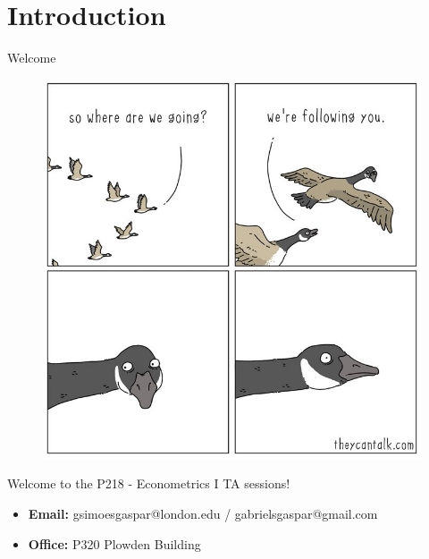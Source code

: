 \section{Introduction}

\begin{frame}{Welcome}

    \begin{figure}[ht]
        \centering
        \includegraphics[width=0.5\linewidth]{./resources/meme-birds.jpeg}
    \end{figure}
    
    Welcome to the P218 - Econometrics I TA sessions!
    \begin{itemize}
        \item \textbf{Email:} gsimoesgaspar@london.edu / gabrielsgaspar@gmail.com
        \item \textbf{Office:} P320 Plowden Building
    \end{itemize}
    
\end{frame}

